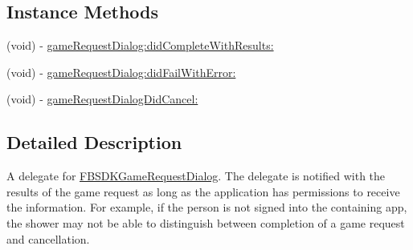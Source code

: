 \subsection*{Instance Methods}
\begin{DoxyCompactItemize}
\item 
(void) -\/ \hyperlink{protocol_f_b_s_d_k_game_request_dialog_delegate-p_afedbb044e8be74848fb18286f1e29ebc}{game\-Request\-Dialog\-:did\-Complete\-With\-Results\-:}
\item 
(void) -\/ \hyperlink{protocol_f_b_s_d_k_game_request_dialog_delegate-p_a6a5f81ed9ea90d242df2c6ee75911d4b}{game\-Request\-Dialog\-:did\-Fail\-With\-Error\-:}
\item 
(void) -\/ \hyperlink{protocol_f_b_s_d_k_game_request_dialog_delegate-p_ab88e9ddb51341468fca4c4131f614b69}{game\-Request\-Dialog\-Did\-Cancel\-:}
\end{DoxyCompactItemize}


\subsection{Detailed Description}
A delegate for \hyperlink{interface_f_b_s_d_k_game_request_dialog}{F\-B\-S\-D\-K\-Game\-Request\-Dialog}.  The delegate is notified with the results of the game request as long as the application has permissions to receive the information. For example, if the person is not signed into the containing app, the shower may not be able to distinguish between completion of a game request and cancellation. 

